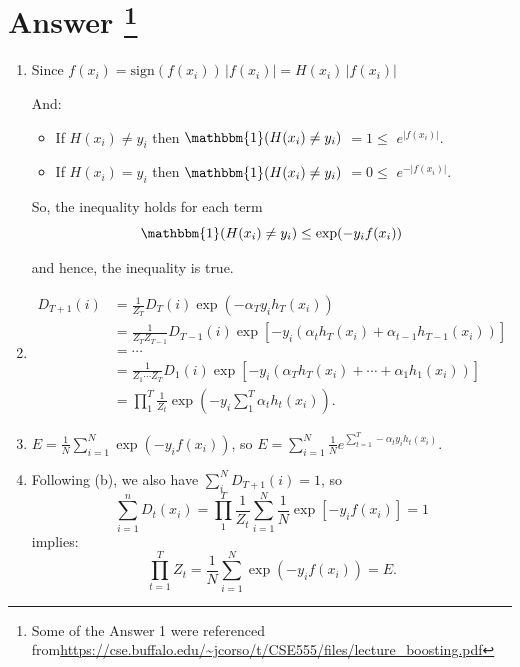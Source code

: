\documentclass[
	12pt, %
]{fphw}
\begin{document}
\section*{Answer \footnote{Some of the Answer 1 were referenced from\url{https://cse.buffalo.edu/~jcorso/t/CSE555/files/lecture_boosting.pdf}}}
\begin{enumerate}
	\itemsep0.3em
	\parskip0.3em
	\item 
	
	Since $f(x_i) = \text{sign}(f(x_i))\,|f(x_i)| = H(x_i)\,|f(x_i)| $
	
	
	And:
	\begin{itemize}
	\item If \( H(x_i) \neq y_i \) then $ \mathbbm{1}(H(x_i) \neq y_i) $ \( = 1 \leq \)  \(  e^{|f(x_i)|} \).
	\item If \( H(x_i) = y_i \) then  $ \mathbbm{1}(H(x_i) \neq y_i) $ \( = 0 \leq \)  \(  e^{-|f(x_i)|} \).
	\end{itemize}
	
	So, the inequality holds for each term
	\begin{equation*}
		\mathbbm{1}(H(x_i) \neq y_i) \leq \exp(-y_i f(x_i)) 
	\end{equation*}
	
	and hence, the inequality is true.
	\item \begin{align*}
		D_{T+1}(i) &= \frac{1}{Z_T} D_T(i) \exp(-\alpha_T y_i h_T(x_i))  \\
				   &= \frac{1}{Z_T Z_{T-1}} D_{T-1}(i) \exp \left[ -y_i (\alpha_t h_T(x_i) + \alpha_{t-1} h_{T-1}(x_i)) \right] \\
				   &= \cdots \\
				   &= \frac{1}{Z_1 \cdots Z_T} D_1(i) \exp \left[ -y_i (\alpha_T h_T(x_i) + \cdots + \alpha_1 h_1(x_i)) \right] \\
				   &= \prod_1^{T}\frac{1}{Z_t}\exp \left( -y_i \sum_{1}^{T}\alpha_t h_t\left(x_i\right)\right).	
				\end{align*}
	\item $E=\frac{1}{N} \sum_{i=1}^N \exp \left(-y_i f\left(x_i\right)\right)	$, so $E=\sum_{i=1}^N \frac{1}{N} e^{\sum_{t=1}^T-\alpha_t y_i h_t\left(x_i\right)}.$
	\item Following (b), we also have $\sum_i^N D_{T+1}(i) = 1$, so 
	\begin{equation*}
		\sum_{i=1}^{n} D_t(x_i) = \prod_1^{T}\frac{1}{Z_t} \sum_{i=1}^{N} \frac{1}{N}\exp[-y_i f(x_i)] = 1 
	\end{equation*}
	implies:
	\begin{equation*}
		\prod_{t=1}^T Z_t=\frac{1}{N} \sum_{i=1}^N \exp \left(-y_i f\left(x_i\right)\right)=E. 
	\end{equation*}
	

\end{enumerate}
\end{document}
